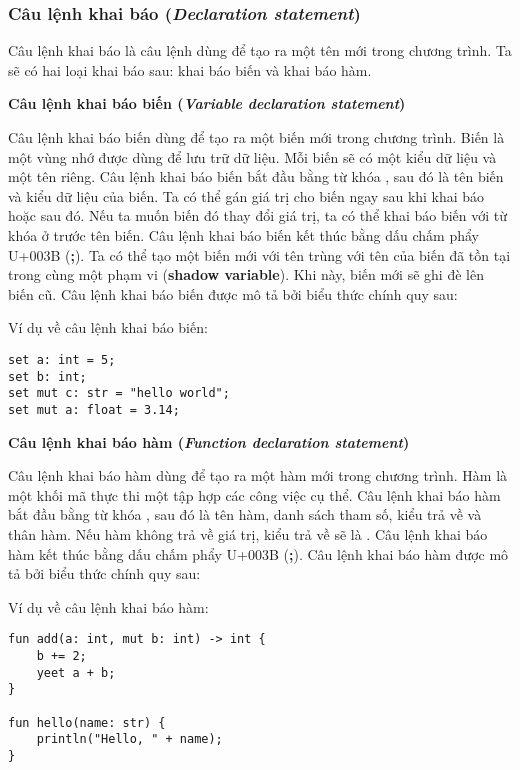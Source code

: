 \subsubsection{Câu lệnh khai báo (\textit{Declaration statement})}

Câu lệnh khai báo là câu lệnh dùng để tạo ra một tên mới trong chương trình. Ta sẽ có hai loại khai báo sau: khai báo biến và khai báo hàm.

\regexdeclstmt

\noindent\textbf{\label{ch2:decl_var_stmt}Câu lệnh khai báo biến (\textit{Variable declaration statement})}

    Câu lệnh khai báo biến dùng để tạo ra một biến mới trong chương trình. Biến là một vùng nhớ được dùng để lưu trữ dữ liệu. Mỗi biến sẽ có một kiểu dữ liệu và một tên riêng. Câu lệnh khai báo biến bắt đầu bằng từ khóa , sau đó là tên biến và kiểu dữ liệu của biến. Ta có thể gán giá trị cho biến ngay sau khi khai báo hoặc sau đó. Nếu ta muốn biến đó thay đổi giá trị, ta có thể khai báo biến với từ khóa  ở trước tên biến. Câu lệnh khai báo biến kết thúc bằng dấu chấm phẩy U+003B (\textbf{;}). Ta có thể tạo một biến mới với tên trùng với tên của biến đã tồn tại trong cùng một phạm vi (\textbf{shadow variable}). Khi này, biến mới sẽ ghi đè lên biến cũ. Câu lệnh khai báo biến được mô tả bởi biểu thức chính quy sau:

\regexvardeclstmt

\noindent Ví dụ về câu lệnh khai báo biến:
\begin{lstlisting}[]
set a: int = 5;
set b: int;
set mut c: str = "hello world";
set mut a: float = 3.14;
\end{lstlisting}

\noindent\textbf{\label{ch2:decl_func_stmt}Câu lệnh khai báo hàm (\textit{Function declaration statement})}

    Câu lệnh khai báo hàm dùng để tạo ra một hàm mới trong chương trình. Hàm là một khối mã thực thi một tập hợp các công việc cụ thể. Câu lệnh khai báo hàm bắt đầu bằng từ khóa , sau đó là tên hàm, danh sách tham số, kiểu trả về và thân hàm. Nếu hàm không trả về giá trị, kiểu trả về sẽ là . Câu lệnh khai báo hàm kết thúc bằng dấu chấm phẩy U+003B (\textbf{;}). Câu lệnh khai báo hàm được mô tả bởi biểu thức chính quy sau:

\regexfuncdeclstmt

\noindent Ví dụ về câu lệnh khai báo hàm:
\begin{lstlisting}[]
fun add(a: int, mut b: int) -> int {
    b += 2;
    yeet a + b;
}

fun hello(name: str) {
    println("Hello, " + name);
}
\end{lstlisting}
